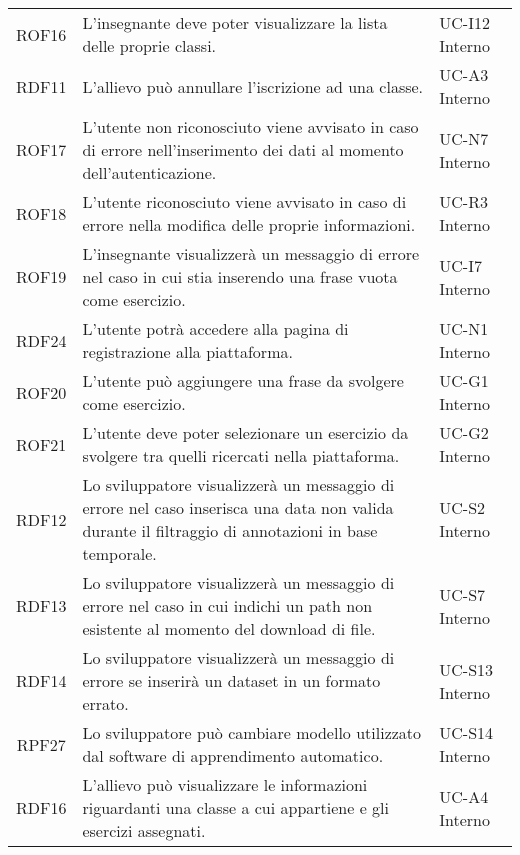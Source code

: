 \begin{tabularx}{\textwidth}{| c | p{10cm} | X |}
		ROF16 & L'insegnante deve poter visualizzare la lista delle proprie classi. & UC-I12 \newline Interno\\
		RDF11 & L'allievo può annullare l'iscrizione ad una classe. & UC-A3 \newline Interno\\
		ROF17 & L'utente non riconosciuto viene avvisato in caso di errore nell'inserimento dei dati al momento dell'autenticazione. & UC-N7 \newline Interno\\
		ROF18 & L'utente riconosciuto viene avvisato in caso di errore nella modifica delle proprie informazioni. & UC-R3 \newline Interno\\
		ROF19 & L'insegnante visualizzerà un messaggio di errore nel caso in cui stia inserendo una frase vuota come esercizio. & UC-I7 \newline Interno\\
		RDF24 & L'utente potrà accedere alla pagina di registrazione alla piattaforma. & UC-N1 \newline Interno\\
		ROF20 & L'utente può aggiungere una frase da svolgere come esercizio. & UC-G1 \newline Interno\\
		ROF21 & L'utente deve poter selezionare un esercizio da svolgere tra quelli ricercati nella piattaforma. & UC-G2 \newline Interno\\
		RDF12 & Lo sviluppatore visualizzerà un messaggio di errore nel caso inserisca una data non valida durante il filtraggio di annotazioni in base temporale. & UC-S2 \newline Interno\\
		RDF13 & Lo sviluppatore visualizzerà un messaggio di errore nel caso in cui indichi un path non esistente al momento del download di file. & UC-S7 \newline Interno\\
		RDF14 & Lo sviluppatore visualizzerà un messaggio di errore se inserirà un dataset in un formato errato. & UC-S13 \newline Interno\\
		RPF27 & Lo sviluppatore può cambiare modello utilizzato dal software di apprendimento automatico. & UC-S14 \newline Interno\\
		RDF16 & L'allievo può visualizzare le informazioni riguardanti una classe a cui appartiene e gli esercizi assegnati. & UC-A4 \newline Interno\\

\end{tabularx}
